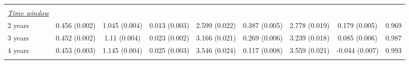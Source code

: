 \begin{tabular}{@{\extracolsep{5pt}} l cccccccc}
 &   &   &   &   &   &   &   &  \\ 
\underline{{\it Time window}} &   &   &   &   &   &   &   &  \\ 
2 years & 0.456 (0.002) & 1.045 (0.004) & 0.013 (0.003) & 2.599 (0.022) & 0.387 (0.005) & 2.778 (0.019) & 0.179 (0.005) & 0.969 \\ 
3 years & 0.452 (0.002) & 1.11 (0.004) & 0.023 (0.002) & 3.166 (0.021) & 0.269 (0.006) & 3.239 (0.018) & 0.085 (0.006) & 0.987 \\ 
4 years & 0.453 (0.003) & 1.145 (0.004) & 0.025 (0.003) & 3.546 (0.024) & 0.117 (0.008) & 3.559 (0.021) & -0.044 (0.007) & 0.993 \\ 
\hline \\[-1.8ex] 
\end{tabular} 
